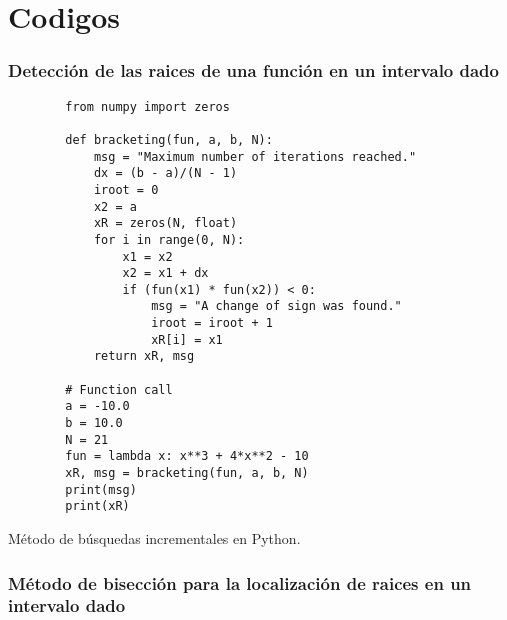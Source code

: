 \graphicspath{{img/algor/}}
\chapter{Codigos}


\subsection{Detección de las raices de una función en un intervalo dado}

\begin{listing}[H]
    \begin{verbatim}
        from numpy import zeros
        
        def bracketing(fun, a, b, N):
            msg = "Maximum number of iterations reached."
            dx = (b - a)/(N - 1)
            iroot = 0
            x2 = a
            xR = zeros(N, float)
            for i in range(0, N):
                x1 = x2
                x2 = x1 + dx
                if (fun(x1) * fun(x2)) < 0:
                    msg = "A change of sign was found."
                    iroot = iroot + 1
                    xR[i] = x1
            return xR, msg

        # Function call
        a = -10.0
        b = 10.0
        N = 21
        fun = lambda x: x**3 + 4*x**2 - 10
        xR, msg = bracketing(fun, a, b, N)
        print(msg)
        print(xR)
    \end{verbatim}
    \caption{Método de búsquedas incrementales en Python.}
    \label{lst:bracketing}
\end{listing}




\subsection{Método de bisección para la localización de raices en un intervalo dado}

